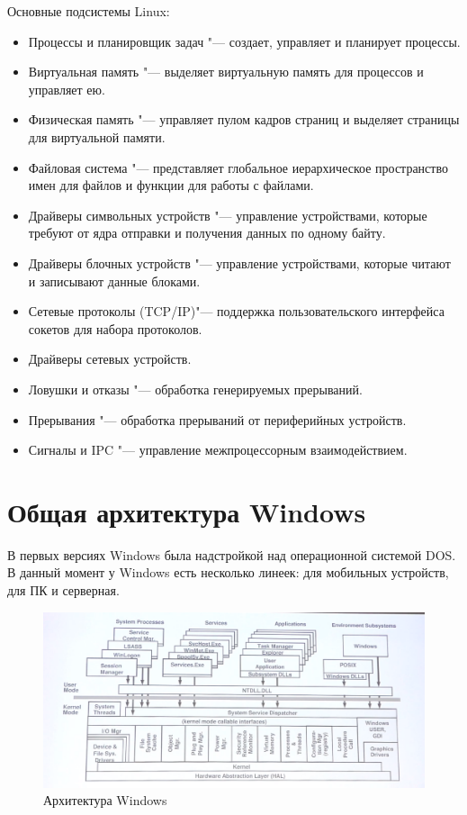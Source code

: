 \documentclass[bachelor, och, book]{SCWorks}
\theoremstyle{remark}
\begin{document}
    \hfill \break
    Основные подсистемы Linux:
    \begin{itemize}[label=$\bullet$]
        \item Процессы и планировщик задач "--- создает, управляет и планирует процессы. 
        \item Виртуальная память "--- выделяет виртуальную память для процессов и управляет ею.
        \item Физическая память "--- управляет пулом кадров страниц и выделяет страницы для виртуальной памяти.
        \item Файловая система "--- представляет глобальное иерархическое пространство имен для файлов и функции для работы с файлами.
        \item Драйверы символьных устройств "--- управление устройствами, которые требуют от ядра отправки и получения данных по одному байту.
        \item Драйверы блочных устройств "--- управление устройствами, которые читают и записывают данные блоками. 
        \item Сетевые протоколы (TCP/IP)"--- поддержка пользовательского интерфейса сокетов для набора протоколов.
        \item Драйверы сетевых устройств.
        \item Ловушки и отказы "--- обработка генерируемых прерываний.
        \item Прерывания "--- обработка прерываний от периферийных устройств. 
        \item Сигналы и IPC "--- управление межпроцессорным взаимодействием.
    \end{itemize}


    \section{Общая архитектура Windows}
    
    В первых версиях Windows была надстройкой над операционной системой DOS. В данный момент у Windows есть несколько линеек: для мобильных устройств, для ПК и серверная.

    \begin{figure}[H]
        \begin{center}
            \includegraphics[scale=0.5]{res/Windows-architecture.png}
            \caption{Архитектура Windows}
        \end{center}
    \end{figure}
\end{document}
